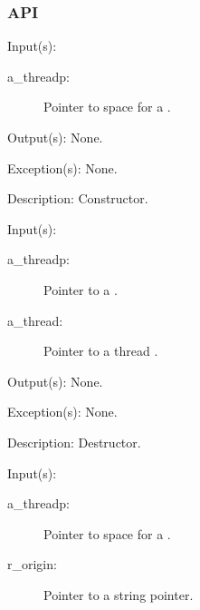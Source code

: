 \subsubsection{API}
\begin{capi}
\label{nxo_threadp_new}
	\begin{capilist}
	\item[Input(s): ]
		\begin{description}\item[]
		\item[a\_threadp: ]
			Pointer to space for a .
		\end{description}
	\item[Output(s): ] None.
	\item[Exception(s): ] None.
	\item[Description: ]
		Constructor.
	\end{capilist}
\label{nxo_threadp_delete}
	\begin{capilist}
	\item[Input(s): ]
		\begin{description}\item[]
		\item[a\_threadp: ]
			Pointer to a \classname{threadp}.
		\item[a\_thread: ]
			Pointer to a thread \classname{nxo}.
		\end{description}
	\item[Output(s): ] None.
	\item[Exception(s): ] None.
	\item[Description: ]
		Destructor.
	\end{capilist}
\label{nxo_threadp_origin_get}
	\begin{capilist}
	\item[Input(s): ]
		\begin{description}\item[]
		\item[a\_threadp: ]
			Pointer to space for a .
		\item[r\_origin: ] Pointer to a string pointer.

\end{description}
\end{capilist}
\end{capi}
